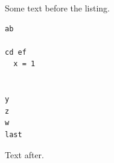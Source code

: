 \documentclass{article}
\begin{document}
Some text before the listing.
\begin{lstlisting}
ab

cd ef
  x = 1


y
z
w
last

\end{lstlisting}
Text after.
\end{document}
